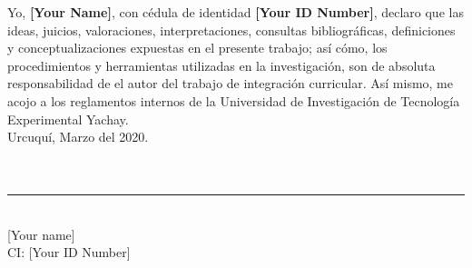 Yo, \textbf{[Your Name]}, con cédula de identidad \textbf{[Your ID Number]}, declaro que las ideas, juicios, valoraciones, interpretaciones, consultas bibliográficas, definiciones y conceptualizaciones expuestas en el presente trabajo; así cómo, los procedimientos y herramientas utilizadas en la investigación, son de absoluta responsabilidad de el autor del trabajo de integración curricular. Así mismo, me acojo a los reglamentos internos de la Universidad de Investigación de Tecnología Experimental Yachay. \\

\noindent Urcuquí, Marzo del 2020. \\
\ \\
\ \\

\begin{center}
    \rule[0mm]{60mm}{0.1mm} \\
    {[Your name]}\\
    CI: {[Your ID Number]}
\end{center}

\thispagestyle{empty} %

